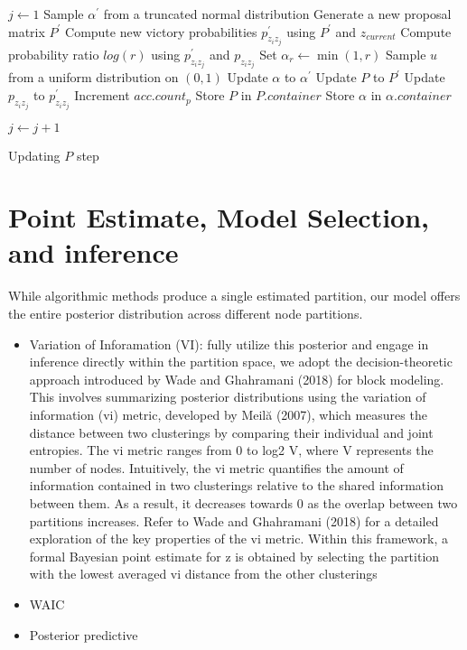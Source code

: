 \documentclass[11pt]{amsart}
\begin{document}
\begin{algorithm}
\begin{algorithmic}[1]
\State $j \gets 1$
\State Sample $\alpha^{\prime}$ from a truncated normal distribution
\State Generate a new proposal matrix $P^{\prime}$
\State Compute new victory probabilities $p_{z_iz_j}^{\prime}$ using $P^{\prime}$ and $z_{current}$
\State Compute probability ratio $log(r)$ using $p_{z_iz_j}^{\prime}$ and $p_{z_iz_j}$
\State Set $\alpha_{r} \gets \min(1, r)$
\State Sample $u$ from a uniform distribution on $(0,1)$
\State Update $\alpha$ to $\alpha^{\prime}$
\State Update $P$ to $P^{\prime}$
\State Update $p_{z_iz_j}$ to $p_{z_iz_j}^{\prime}$
\State Increment $acc.count_{p}$
\EndIf
\State Store $P$ in $P.container$
\State Store $\alpha$ in $\alpha.container$

\State $j \gets j+1$
\EndWhile
\end{algorithmic}
\caption{Updating $P$ step}
\end{algorithm}


\section{Point Estimate, Model Selection,  and inference}

While algorithmic methods produce a single estimated partition, our model offers the entire posterior distribution across different node partitions. 

\begin{itemize}
\item Variation of Inforamation (VI):  fully utilize this posterior and engage in inference directly within the partition space, we adopt the decision-theoretic approach introduced by Wade and Ghahramani (2018) for block modeling. This involves summarizing posterior distributions using the variation of information (vi) metric, developed by Meilă (2007), which measures the distance between two clusterings by comparing their individual and joint entropies. The vi metric ranges from 0 to log2 V, where V represents the number of nodes. Intuitively, the vi metric quantifies the amount of information contained in two clusterings relative to the shared information between them. As a result, it decreases towards 0 as the overlap between two partitions increases. Refer to Wade and Ghahramani (2018) for a detailed exploration of the key properties of the vi metric. Within this framework, a formal Bayesian point estimate for z is obtained by selecting the partition with the lowest averaged vi distance from the other clusterings
\item WAIC 
\item Posterior predictive
\end{itemize}
\end{document}
